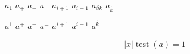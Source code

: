 \documentclass{minimal}
\begin{document}
$a_1$
$a_+$
$a_-$
$a_=$
$a_{i + 1}$
$a_{i+1}$
$a_{\beta k}$
$a_{\hat k}$

$a^1$
$a^+$
$a^-$
$a^=$
$a^{i + 1}$
$a^{i+1}$
$a^{\hat k}$

\begin{equation}
  \bigl\lvert x \bigr\rvert
  \operatorname{test}(a) = 1
\end{equation}
\end{document}
